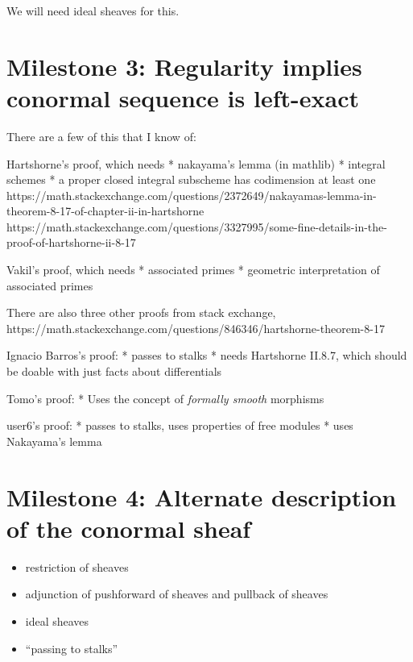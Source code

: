 \documentclass[a4paper]{article}
\begin{document}
We will need ideal sheaves for this.

\section{Milestone 3: Regularity implies conormal sequence is left-exact}

There are a few of this that I know of:

Hartshorne's proof, which needs
* nakayama's lemma (in mathlib)
* integral schemes
* a proper closed integral subscheme has codimension at least one
https://math.stackexchange.com/questions/2372649/nakayamas-lemma-in-theorem-8-17-of-chapter-ii-in-hartshorne
https://math.stackexchange.com/questions/3327995/some-fine-details-in-the-proof-of-hartshorne-ii-8-17

Vakil's proof, which needs
* associated primes
* geometric interpretation of associated primes

There are also three other proofs from stack exchange,
https://math.stackexchange.com/questions/846346/hartshorne-theorem-8-17

Ignacio Barros's proof:
* passes to stalks
* needs Hartshorne II.8.7, which should be doable with just 
   facts about differentials

Tomo's proof:
* Uses the concept of \textit{formally smooth} morphisms

user6's proof:
* passes to stalks, uses properties of free modules
* uses Nakayama's lemma




\section{Milestone 4: Alternate description of the conormal sheaf}

\begin{itemize}
	\item restriction of sheaves
	\item adjunction of pushforward of sheaves and pullback of sheaves
	\item ideal sheaves
	\item ``passing to stalks''
\end{itemize}
\end{document}
